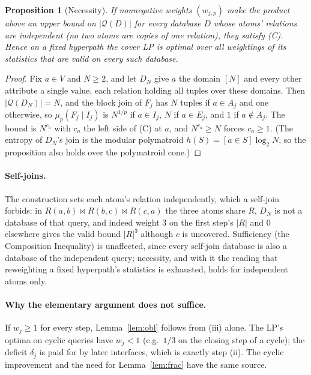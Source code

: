 \documentclass[11pt]{article}
\newcommand{\query}{\mathcal{Q}}
\newcommand{\block}{F}
\newcommand{\interface}{I}
\newcommand{\muLp}[3]{\mu_{#1}(#2 \mid #3)}
\newtheorem{proposition}{Proposition}
\begin{document}
\begin{proposition}[Necessity]
If nonnegative weights $(w_{j,p})$ make the product above an upper bound on
$|\query(D)|$ for every database $D$ whose atoms' relations are
independent (no two atoms are copies of one relation), they satisfy (C).
Hence on a fixed hyperpath the cover LP is optimal over all weightings of
its statistics that are valid on every such database.
\end{proposition}
\begin{proof}
Fix $a\in V$ and $N\ge2$, and let $D_N$ give $a$ the domain $[N]$ and every
other attribute a single value, each relation holding all tuples over
these domains. Then $|\query(D_N)|=N$, and the block join of $\block_j$ has
$N$ tuples if $a\in A_j$ and one otherwise, so
$\muLp{p}{\block_j}{\interface_j}$ is $N^{1/p}$ if $a\in\interface_j$, $N$
if $a\in E_j$, and $1$ if $a\notin A_j$. The bound is $N^{c_a}$ with $c_a$
the left side of (C) at $a$, and $N^{c_a}\ge N$ forces $c_a\ge1$. (The
entropy of $D_N$'s join is the modular polymatroid $h(S)=[a\in S]\log_2N$,
so the proposition also holds over the polymatroid cone.)
\end{proof}

\paragraph{Self-joins.} The construction sets each atom's relation
independently, which a self-join forbids: in $R(a,b)\bowtie R(b,c)\bowtie
R(c,a)$ the three atoms share $R$, $D_N$ is not a database of that query,
and indeed weight $3$ on the first step's $|R|$ and $0$ elsewhere gives the
valid bound $|R|^3$ although $c$ is uncovered. Sufficiency (the
Composition Inequality) is unaffected, since every self-join database is
also a database of the independent query; necessity, and with it the
reading that reweighting a fixed hyperpath's statistics is exhausted,
holds for independent atoms only.

\paragraph{Why the elementary argument does not suffice.} If $w_j\ge1$ for
every step, Lemma~\ref{lem:obl} follows from (iii) alone. The LP's optima
on cyclic queries have $w_j<1$ (e.g.\ $1/3$ on the closing step of a
cycle); the deficit $\delta_j$ is paid for by later interfaces, which is
exactly step (ii). The cyclic improvement and the need for
Lemma~\ref{lem:frac} have the same source.
\end{document}
